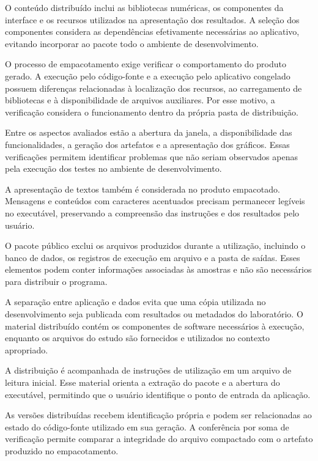O conteúdo distribuído inclui as bibliotecas numéricas, os componentes da interface e os recursos utilizados na apresentação dos resultados. A seleção dos componentes considera as dependências efetivamente necessárias ao aplicativo, evitando incorporar ao pacote todo o ambiente de desenvolvimento.

O processo de empacotamento exige verificar o comportamento do produto gerado. A execução pelo código-fonte e a execução pelo aplicativo congelado possuem diferenças relacionadas à localização dos recursos, ao carregamento de bibliotecas e à disponibilidade de arquivos auxiliares. Por esse motivo, a verificação considera o funcionamento dentro da própria pasta de distribuição.

Entre os aspectos avaliados estão a abertura da janela, a disponibilidade das funcionalidades, a geração dos artefatos e a apresentação dos gráficos. Essas verificações permitem identificar problemas que não seriam observados apenas pela execução dos testes no ambiente de desenvolvimento.

A apresentação de textos também é considerada no produto empacotado. Mensagens e conteúdos com caracteres acentuados precisam permanecer legíveis no executável, preservando a compreensão das instruções e dos resultados pelo usuário.

O pacote público exclui os arquivos produzidos durante a utilização, incluindo o banco de dados, os registros de execução em arquivo e a pasta de saídas. Esses elementos podem conter informações associadas às amostras e não são necessários para distribuir o programa.

A separação entre aplicação e dados evita que uma cópia utilizada no desenvolvimento seja publicada com resultados ou metadados do laboratório. O material distribuído contém os componentes de software necessários à execução, enquanto os arquivos do estudo são fornecidos e utilizados no contexto apropriado.

A distribuição é acompanhada de instruções de utilização em um arquivo de leitura inicial. Esse material orienta a extração do pacote e a abertura do executável, permitindo que o usuário identifique o ponto de entrada da aplicação.

As versões distribuídas recebem identificação própria e podem ser relacionadas ao estado do código-fonte utilizado em sua geração. A conferência por soma de verificação permite comparar a integridade do arquivo compactado com o artefato produzido no empacotamento.

